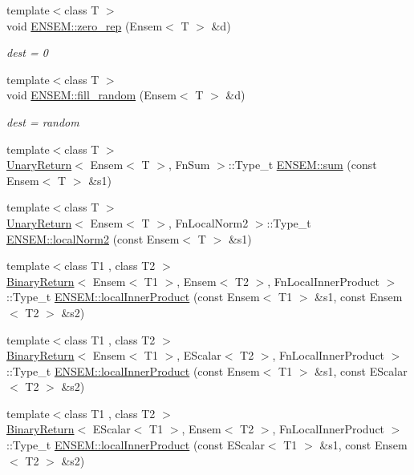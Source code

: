\begin{DoxyCompactItemize}
{\footnotesize template$<$class T $>$ }\\void \mbox{\hyperlink{group__eensem_gafc79cdca8881b76b79874dce8e6a3816}{E\+N\+S\+E\+M\+::zero\+\_\+rep}} (Ensem$<$ T $>$ \&d)
\begin{DoxyCompactList}\small\item\em dest = 0 \end{DoxyCompactList}\item 
{\footnotesize template$<$class T $>$ }\\void \mbox{\hyperlink{group__eensem_gaa016282cc53ea94b4fc28c2714c30294}{E\+N\+S\+E\+M\+::fill\+\_\+random}} (Ensem$<$ T $>$ \&d)
\begin{DoxyCompactList}\small\item\em dest = random \end{DoxyCompactList}\item 
{\footnotesize template$<$class T $>$ }\\\mbox{\hyperlink{structUnaryReturn}{Unary\+Return}}$<$ Ensem$<$ T $>$, Fn\+Sum $>$\+::Type\+\_\+t \mbox{\hyperlink{group__eensem_gac055c3d3de5296fcc478482fc09633ce}{E\+N\+S\+E\+M\+::sum}} (const Ensem$<$ T $>$ \&s1)
\item 
{\footnotesize template$<$class T $>$ }\\\mbox{\hyperlink{structUnaryReturn}{Unary\+Return}}$<$ Ensem$<$ T $>$, Fn\+Local\+Norm2 $>$\+::Type\+\_\+t \mbox{\hyperlink{group__eensem_gadea3947facb136bb23ca06c2e6e09400}{E\+N\+S\+E\+M\+::local\+Norm2}} (const Ensem$<$ T $>$ \&s1)
\item 
{\footnotesize template$<$class T1 , class T2 $>$ }\\\mbox{\hyperlink{structBinaryReturn}{Binary\+Return}}$<$ Ensem$<$ T1 $>$, Ensem$<$ T2 $>$, Fn\+Local\+Inner\+Product $>$\+::Type\+\_\+t \mbox{\hyperlink{group__eensem_ga5f487a5a9eb850aeb6bbd0375d54615c}{E\+N\+S\+E\+M\+::local\+Inner\+Product}} (const Ensem$<$ T1 $>$ \&s1, const Ensem$<$ T2 $>$ \&s2)
\item 
{\footnotesize template$<$class T1 , class T2 $>$ }\\\mbox{\hyperlink{structBinaryReturn}{Binary\+Return}}$<$ Ensem$<$ T1 $>$, E\+Scalar$<$ T2 $>$, Fn\+Local\+Inner\+Product $>$\+::Type\+\_\+t \mbox{\hyperlink{group__eensem_gabc088ed28b376f4b542a0fcd1337b609}{E\+N\+S\+E\+M\+::local\+Inner\+Product}} (const Ensem$<$ T1 $>$ \&s1, const E\+Scalar$<$ T2 $>$ \&s2)
\item 
{\footnotesize template$<$class T1 , class T2 $>$ }\\\mbox{\hyperlink{structBinaryReturn}{Binary\+Return}}$<$ E\+Scalar$<$ T1 $>$, Ensem$<$ T2 $>$, Fn\+Local\+Inner\+Product $>$\+::Type\+\_\+t \mbox{\hyperlink{group__eensem_gad3fbed60bbedae0c1abcbdbfc4bbcc0a}{E\+N\+S\+E\+M\+::local\+Inner\+Product}} (const E\+Scalar$<$ T1 $>$ \&s1, const Ensem$<$ T2 $>$ \&s2)

\end{DoxyCompactItemize}
